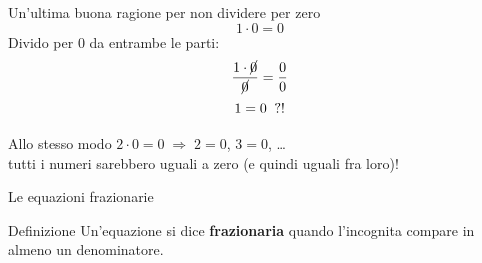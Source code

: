 \documentclass[aspectratio=169,11pt]{beamer}
\begin{document}

\begin{frame}{Un'ultima buona ragione per non dividere per zero}
  \[
    1 \cdot 0 = 0
  \]
  \pause
  Divido per $0$ da entrambe le parti:
  \[
    \frac{1 \cdot \cancel{0}}{\cancel{0}} = \frac{0}{0}
  \]
  \pause
  \[
    \Large 1 = 0 \;\;?!
  \]
  \pause
  \begin{center}
    Allo stesso modo $2\cdot 0 = 0 \;\Rightarrow\; 2 = 0$, \quad $3 = 0$, \quad \ldots\\[0.4em]
    \textcolor{rosso}{tutti i numeri sarebbero uguali a zero (e quindi uguali fra loro)!}
  \end{center}
\end{frame}

\begin{frame}{Le equazioni frazionarie}
  \begin{block}{Definizione}
    Un'equazione si dice \textbf{frazionaria} quando l'incognita compare in almeno un denominatore.
  \end{block}
\end{frame}
\end{document}

